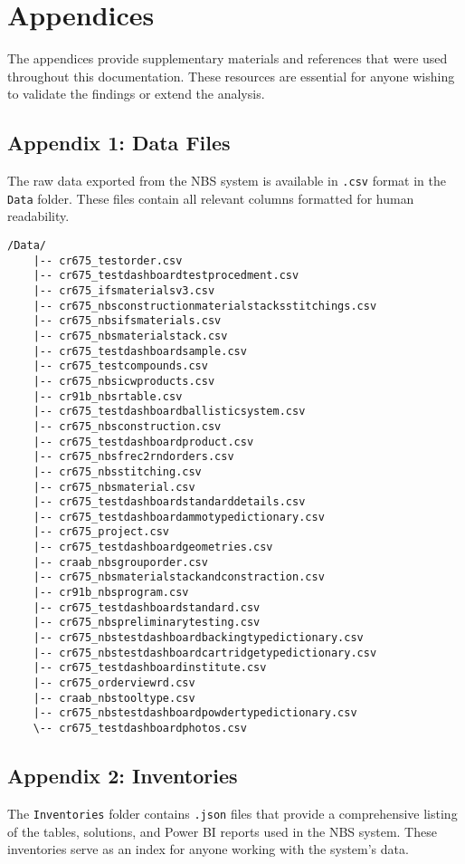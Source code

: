 \section{Appendices}
\label{sec:Appendices}

The appendices provide supplementary materials and references that were used throughout this documentation. These resources are essential for anyone wishing to validate the findings or extend the analysis.

\subsection{Appendix 1: Data Files}
The raw data exported from the NBS system is available in \texttt{.csv} format in the \texttt{Data} folder. These files contain all relevant columns formatted for human readability.

\begin{verbatim}
/Data/
    |-- cr675_testorder.csv
    |-- cr675_testdashboardtestprocedment.csv
    |-- cr675_ifsmaterialsv3.csv
    |-- cr675_nbsconstructionmaterialstacksstitchings.csv
    |-- cr675_nbsifsmaterials.csv
    |-- cr675_nbsmaterialstack.csv
    |-- cr675_testdashboardsample.csv
    |-- cr675_testcompounds.csv
    |-- cr675_nbsicwproducts.csv
    |-- cr91b_nbsrtable.csv
    |-- cr675_testdashboardballisticsystem.csv
    |-- cr675_nbsconstruction.csv
    |-- cr675_testdashboardproduct.csv
    |-- cr675_nbsfrec2rndorders.csv
    |-- cr675_nbsstitching.csv
    |-- cr675_nbsmaterial.csv
    |-- cr675_testdashboardstandarddetails.csv
    |-- cr675_testdashboardammotypedictionary.csv
    |-- cr675_project.csv
    |-- cr675_testdashboardgeometries.csv
    |-- craab_nbsgrouporder.csv
    |-- cr675_nbsmaterialstackandconstraction.csv
    |-- cr91b_nbsprogram.csv
    |-- cr675_testdashboardstandard.csv
    |-- cr675_nbspreliminarytesting.csv
    |-- cr675_nbstestdashboardbackingtypedictionary.csv
    |-- cr675_nbstestdashboardcartridgetypedictionary.csv
    |-- cr675_testdashboardinstitute.csv
    |-- cr675_orderviewrd.csv
    |-- craab_nbstooltype.csv
    |-- cr675_nbstestdashboardpowdertypedictionary.csv
    \-- cr675_testdashboardphotos.csv
\end{verbatim}

\subsection{Appendix 2: Inventories}
The \texttt{Inventories} folder contains \texttt{.json} files that provide a comprehensive listing of the tables, solutions, and Power BI reports used in the NBS system. These inventories serve as an index for anyone working with the system’s data.


